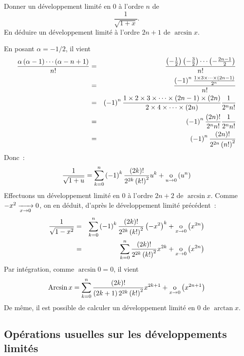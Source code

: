 \documentclass{magnolia}
\begin{document}

\begin{exoUnique}
\exo Donner un développement limité en 0 à l'ordre $n$ de
  \[\frac{1}{\sqrt{1+x}}.\]
  En déduire un développement limité à l'ordre $2n+1$ de $\arcsin x$.
  \begin{sol}
  En posant $\alpha=-1/2$, il vient
  \begin{eqnarray*}
  \frac{\alpha\p{\alpha-1}\cdots\p{\alpha-n+1}}{n!}
  &=& \frac{\p{-\frac{1}{2}}\p{-\frac{3}{2}}\cdots\p{-\frac{2n-1}{2}}}{n!}\\
  &=& \frac{\p{-1}^n\frac{1\times 3\times\cdots\times\p{2n-1}}{2^n}}{n!}\\
  &=& \p{-1}^n\frac{1\times 2\times 3\times\cdots\times\p{2n-1}\times\p{2n}}%
       {2\times 4\times\cdots\times\p{2n}}\frac{1}{2^n n!}\\
  &=& \p{-1}^n\frac{\p{2n}!}{2^nn!}\frac{1}{2^n n!}\\
  &=& \p{-1}^n\frac{\p{2n}!}{2^{2n}\p{n!}^2}
  \end{eqnarray*}
  Donc~:
  \[\frac{1}{\sqrt{1+u}}=\sum_{k=0}^n \left(-1\right)^k\frac{\left(2k\right)!}{2^{2k}\left(k!\right)^2}u^k
    +\underset{u \rightarrow 0}{\text{o}}\left(u^n\right)\]    
  Effectuons un développement limité en 0 à l'ordre $2n+2$ de $\arcsin x$.
  Comme $-x^2\xrightarrow[x\rightarrow 0]{}0$, on en déduit, d'après le développement limité
  précédent~:
  \begin{eqnarray*}
  \frac{1}{\sqrt{1-x^2}}
  &=& \sum_{k=0}^n \left(-1\right)^k\frac{\left(2k\right)!}{2^{2k}\left(k!\right)^2}\left(-x^2\right)^k+
       \underset{x \rightarrow 0}{\text{o}}\left(x^{2n}\right)\\
  &=& \sum_{k=0}^n \frac{\left(2k\right)!}{2^{2k}\left(k!\right)^2} x^{2k}+
       \underset{x \rightarrow 0}{\text{o}}\left(x^{2n}\right)
  \end{eqnarray*}
  Par intégration, comme $\arcsin 0=0$, il vient
  \[\operatorname{Arcsin} x= \sum_{k=0}^n \frac{\left(2k\right)!}{\left(2k+1\right)2^{2k}\left(k!\right)^2} x^{2k+1}+
       \underset{x \rightarrow 0}{\text{o}}\left(x^{2n+1}\right)\]
  De même, il est possible de calculer un développement limité en 0 de
  $\arctan x$.
  \end{sol}
\end{exoUnique}

\subsection{Opérations usuelles sur les développements limités}
\end{document}
